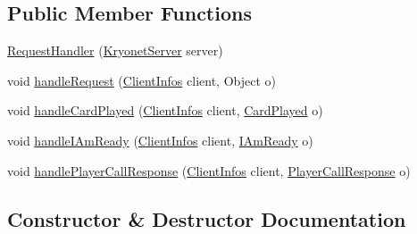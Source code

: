 \subsection*{Public Member Functions}
\begin{DoxyCompactItemize}
\item 
\mbox{\hyperlink{classServer_1_1ServerConnexion_1_1RequestHandler_a4cedcc90cb128b9781735e8149fa4801}{Request\+Handler}} (\mbox{\hyperlink{classServer_1_1ServerConnexion_1_1KryonetServer}{Kryonet\+Server}} server)
\item 
void \mbox{\hyperlink{classServer_1_1ServerConnexion_1_1RequestHandler_af8f168ba8f0f372af423c44d87dec13f}{handle\+Request}} (\mbox{\hyperlink{classServer_1_1ServerConnexion_1_1ClientInfos}{Client\+Infos}} client, Object o)
\item 
void \mbox{\hyperlink{classServer_1_1ServerConnexion_1_1RequestHandler_a0a48f220efcfc97fca14564ce8daa43e}{handle\+Card\+Played}} (\mbox{\hyperlink{classServer_1_1ServerConnexion_1_1ClientInfos}{Client\+Infos}} client, \mbox{\hyperlink{classCommon_1_1CardPlayed}{Card\+Played}} o)
\item 
void \mbox{\hyperlink{classServer_1_1ServerConnexion_1_1RequestHandler_a490c790aa95eea47bd51f380e030729d}{handle\+I\+Am\+Ready}} (\mbox{\hyperlink{classServer_1_1ServerConnexion_1_1ClientInfos}{Client\+Infos}} client, \mbox{\hyperlink{classCommon_1_1IAmReady}{I\+Am\+Ready}} o)
\item 
void \mbox{\hyperlink{classServer_1_1ServerConnexion_1_1RequestHandler_a87669742b2b85431cad3084999fa31e5}{handle\+Player\+Call\+Response}} (\mbox{\hyperlink{classServer_1_1ServerConnexion_1_1ClientInfos}{Client\+Infos}} client, \mbox{\hyperlink{classCommon_1_1PlayerCallResponse}{Player\+Call\+Response}} o)
\end{DoxyCompactItemize}


\subsection{Constructor \& Destructor Documentation}
\mbox{\label{classServer_1_1ServerConnexion_1_1RequestHandler_a4cedcc90cb128b9781735e8149fa4801}} 
